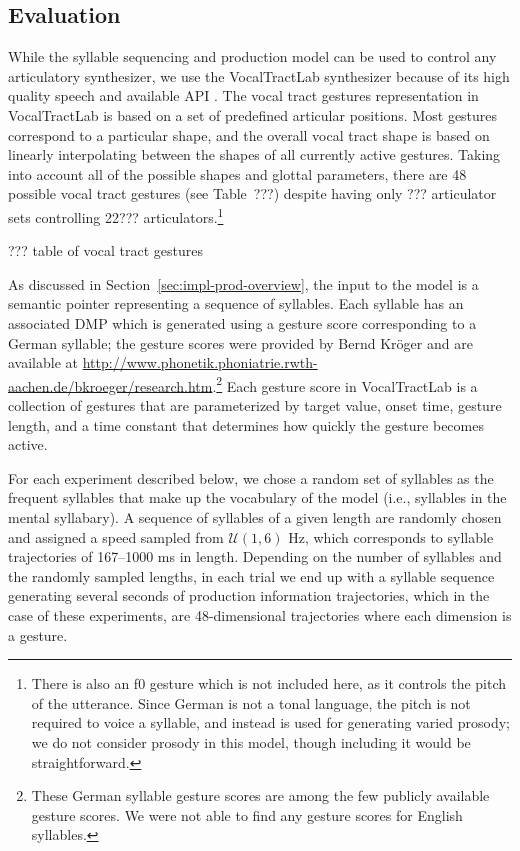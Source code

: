 \subsection{Evaluation}

While the syllable sequencing and production model
can be used to control any articulatory synthesizer,
we use the VocalTractLab synthesizer
because of its high quality speech
and available API \citep{birkholz2013}.
The vocal tract gestures representation
in VocalTractLab is based on a set of
predefined articular positions.
Most gestures correspond to
a particular shape,
and the overall vocal tract shape
is based on linearly interpolating
between the shapes of
all currently active gestures.
Taking into account all of the
possible shapes and glottal parameters,
there are 48 possible vocal tract gestures
(see Table~???) despite having only
??? articulator sets
controlling 22??? articulators.\footnote{
  There is also an f0 gesture which is not included here,
  as it controls the pitch of the utterance.
  Since German is not a tonal language,
  the pitch is not required to voice a syllable,
  and instead is used for generating
  varied prosody;
  we do not consider prosody in this model,
  though including it would be straightforward.}

??? table of vocal tract gestures

As discussed in Section~\ref{sec:impl-prod-overview},
the input to the model
is a semantic pointer
representing a sequence of syllables.
Each syllable has an associated DMP
which is generated using
a gesture score corresponding to
a German syllable;
the gesture scores were provided by
Bernd Kr\"{o}ger and are available at
\url{http://www.phonetik.phoniatrie.rwth-aachen.de/bkroeger/research.htm}.\footnote{
  These German syllable gesture scores are among
  the few publicly available gesture scores.
  We were not able to find any gesture scores
  for English syllables.}
Each gesture score in VocalTractLab
is a collection of
gestures that are parameterized by target value,
onset time, gesture length,
and a time constant that determines
how quickly the gesture becomes active.

For each experiment described below,
we chose a random set of syllables
as the frequent syllables
that make up the vocabulary
of the model
(i.e., syllables in the mental syllabary).
A sequence of syllables of a given length
are randomly chosen and assigned a speed
sampled from $\mathcal{U}(1, 6)$ Hz,
which corresponds to syllable trajectories of
167--1000 ms in length.
Depending on the number of syllables
and the randomly sampled lengths,
in each trial we end up with a syllable sequence
generating several seconds
of production information trajectories,
which in the case of these experiments,
are 48-dimensional trajectories
where each dimension is a gesture.


